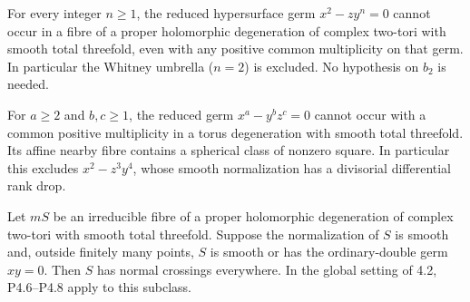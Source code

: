
\begin{proposition}[P4.16]\hypertarget{tag-02WN}{}\label{night:P4.16}\label{stmt:P4.16}


For every integer $n\geq1$, the reduced hypersurface germ
$x^2-zy^n=0$ cannot occur in a fibre of a proper holomorphic
degeneration of complex two-tori with smooth total threefold,
even with any positive common multiplicity on that germ.
In particular the Whitney umbrella ($n=2$) is excluded.
No hypothesis on $b_2$ is needed.
\end{proposition}

\begin{proposition}[P4.18]\hypertarget{tag-02WP}{}\label{night:P4.18}\label{stmt:P4.18}


For $a\geq2$ and $b,c\geq1$, the reduced germ
$x^a-y^bz^c=0$ cannot occur with a common positive multiplicity
in a torus degeneration with smooth total threefold. Its affine
nearby fibre contains a spherical class of nonzero square.
In particular this excludes $x^2-z^3y^4$, whose smooth
normalization has a divisorial differential rank drop.
\end{proposition}

\begin{proposition}[P4.20]\hypertarget{tag-02WS}{}\label{night:P4.20}\label{stmt:P4.20}


Let $mS$ be an irreducible fibre of a proper holomorphic
degeneration of complex two-tori with smooth total threefold.
Suppose the normalization of $S$ is smooth and, outside
finitely many points, $S$ is smooth or has the ordinary-double
germ $xy=0$. Then $S$ has normal crossings everywhere.
In the global setting of 4.2, P4.6--P4.8 apply to this subclass.
\end{proposition}

